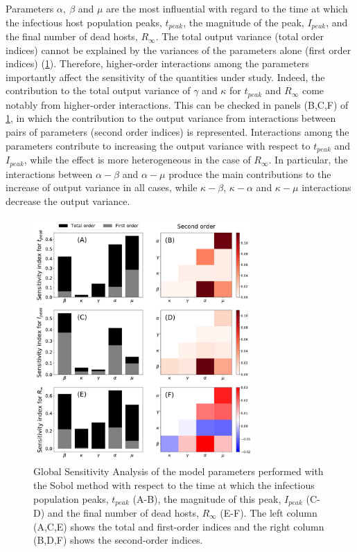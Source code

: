 Parameters $\alpha, \ \beta$ and $\mu$ are the most influential with regard
to the time at which the infectious host population peaks, $t_{peak}$, the
magnitude of the peak, $I_{peak}$, and the final number of dead hosts,
$R_{\infty}$. The total output variance (total order indices) cannot be
explained by the variances of the parameters alone (first order indices)
(\cref{fig:GSA}). Therefore, higher-order interactions among the parameters
importantly affect the sensitivity of the quantities under study. Indeed, the
contribution to the total output variance of $\gamma$ and $\kappa$ for
$t_{peak}$ and $R_{\infty}$ come notably from higher-order interactions. This
can be checked in panels (B,C,F) of \cref{fig:GSA}, in which the contribution
to the output variance from interactions between pairs of parameters (second
order indices) is represented. Interactions among the parameters contribute to
increasing the output variance with respect to $t_{peak}$ and $I_{peak}$, while
the effect is more heterogeneous in the case of $R_{\infty}$. In particular,
the interactions between $\alpha-\beta$ and $\alpha-\mu$ produce the main
contributions to the increase of output variance in all cases, while
$\kappa-\beta$, $\kappa-\alpha$ and $\kappa-\mu$ interactions decrease the
output variance.

\begin{figure}[H]
    \centering
    \includegraphics[width=0.75\textwidth]{Figures/GSA.pdf}
    \caption[Global Sensitivity Analysis of the model]{Global Sensitivity
        Analysis of the model parameters performed
        with the Sobol method with respect to the time at which the infectious
        population peaks, $t_{peak}$ (A-B), the magnitude of this peak,
        $I_{peak}$
        (C-D) and the final number of dead hosts, $R_{\infty}$ (E-F). The left
        column
        (A,C,E) shows the total and first-order indices and the right column
        (B,D,F)
        shows the second-order indices.}
    \label{fig:GSA}
\end{figure}

